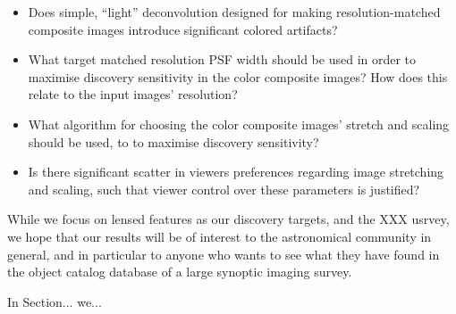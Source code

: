 \documentclass[letterpaper, 11pt]{article}
\begin{document}
\begin{itemize}

\item Does simple, ``light'' deconvolution designed for making
resolution-matched composite images introduce significant colored artifacts?

\item What target matched resolution PSF width should be used in order to
maximise discovery sensitivity in the color composite images? How does this
relate to the input images' resolution?

\item What algorithm for choosing the color composite images' stretch and
scaling should be used, to to maximise discovery sensitivity? 

\item Is there significant scatter in viewers preferences regarding image
stretching and scaling, such that viewer control over these parameters is
justified?

\end{itemize}

While we focus on lensed features as our discovery targets, and the XXX
usrvey, we hope that our results will be of interest to the astronomical
community in general, and in particular to anyone who wants to see what they
have found in the object catalog database of a large synoptic imaging survey.

In Section... we...
\end{document}
